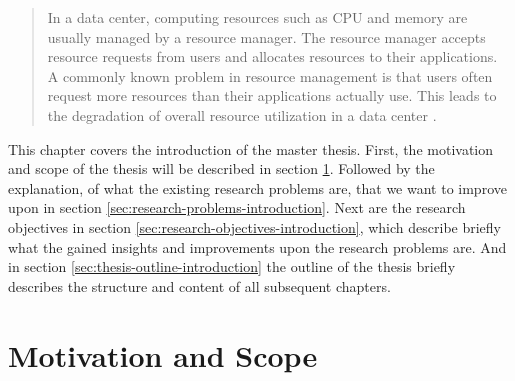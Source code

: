     \begin{quote}
        In a data center, computing resources such as CPU and memory are usually managed by a resource manager. The resource manager accepts resource requests from users and allocates resources to their applications. A commonly known problem in resource management is that users often request more resources than their applications actually use. This leads to the degradation of overall resource utilization in a data center \cite{thonglekImprovingResourceUtilization2019}.
    \end{quote}

    This chapter covers the introduction of the master thesis.
    First, the motivation and scope of the thesis will be described in section \ref{sec:motivation-and-scope-introduction}.
    Followed by the explanation, of what the existing research problems are, that we want to improve upon in section \ref{sec:research-problems-introduction}. Next are the research objectives in section \ref{sec:research-objectives-introduction}, which describe briefly what the gained insights and improvements upon the research problems are. And in section \ref{sec:thesis-outline-introduction} the outline of the thesis briefly describes the structure and content of all subsequent chapters.

        \section{Motivation and Scope}
        \label{sec:motivation-and-scope-introduction}

